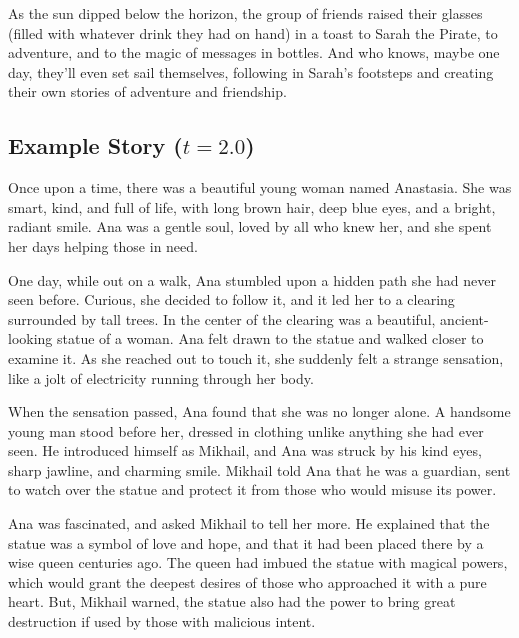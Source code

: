 \documentclass[a4paper]{article}
\begin{document}
\hspace{10pt} As the sun dipped below the horizon, the group of friends raised their glasses (filled with whatever drink they had on hand) in a toast to Sarah the Pirate, to adventure, and to the magic of messages in bottles. And who knows, maybe one day, they'll even set sail themselves, following in Sarah's footsteps and creating their own stories of adventure and friendship.
\rmfamily

\newpage
\subsection*{Example Story ($t = 2.0$)}\label{app:example-t2}

\sffamily
\small


Once upon a time, there was a beautiful young woman named Anastasia. She was smart, kind, and full of life, with long brown hair, deep blue eyes, and a bright, radiant smile. Ana was a gentle soul, loved by all who knew her, and she spent her days helping those in need. \vspace{1ex}

\hspace{10pt} One day, while out on a walk, Ana stumbled upon a hidden path she had never seen before. Curious, she decided to follow it, and it led her to a clearing surrounded by tall trees. In the center of the clearing was a beautiful, ancient-looking statue of a woman. Ana felt drawn to the statue and walked closer to examine it. As she reached out to touch it, she suddenly felt a strange sensation, like a jolt of electricity running through her body.\vspace{1ex}

\hspace{10pt} When the sensation passed, Ana found that she was no longer alone. A handsome young man stood before her, dressed in clothing unlike anything she had ever seen. He introduced himself as Mikhail, and Ana was struck by his kind eyes, sharp jawline, and charming smile. Mikhail told Ana that he was a guardian, sent to watch over the statue and protect it from those who would misuse its power.\vspace{1ex}

\hspace{10pt} Ana was fascinated, and asked Mikhail to tell her more. He explained that the statue was a symbol of love and hope, and that it had been placed there by a wise queen centuries ago. The queen had imbued the statue with magical powers, which would grant the deepest desires of those who approached it with a pure heart. But, Mikhail warned, the statue also had the power to bring great destruction if used by those with malicious intent.\vspace{1ex}
\end{document}
